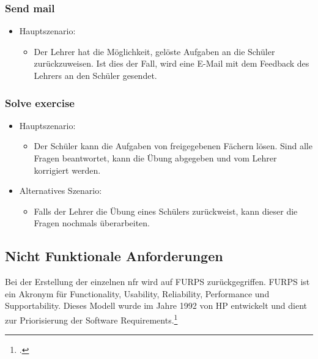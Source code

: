 \subsubsection*{Send mail}
\begin{itemize}
	\item Hauptszenario:
	\begin{itemize}
		\item Der Lehrer hat die Möglichkeit, gelöste Aufgaben an die Schüler zurückzuweisen. Ist dies der Fall, wird eine E-Mail mit dem Feedback des Lehrers an den Schüler gesendet.
	\end{itemize}
\end{itemize}


\subsubsection*{Solve exercise}
\begin{itemize}
	\item Hauptszenario:
	\begin{itemize}
		\item Der Schüler kann die Aufgaben von freigegebenen Fächern lösen. Sind alle Fragen beantwortet, kann die Übung abgegeben und vom Lehrer korrigiert werden.
	\end{itemize}
	\item Alternatives Szenario:
	\begin{itemize}
		\item Falls der Lehrer die Übung eines Schülers zurückweist, kann dieser die Fragen nochmals überarbeiten.
	\end{itemize}
\end{itemize}


\subsection{Nicht Funktionale Anforderungen}
Bei der Erstellung der einzelnen \gls{nfr} wird auf FURPS zurückgegriffen. FURPS ist ein Akronym für Functionality, Usability, Reliability, Performance und Supportability. Dieses Modell wurde im Jahre 1992 von HP entwickelt und dient zur Priorisierung der Software Requirements.\footcite{furps_description}


